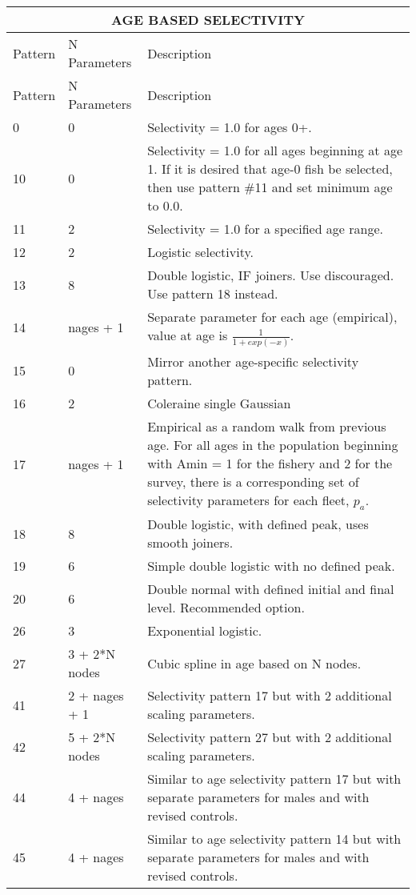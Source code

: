\begin{longtable}{p{2cm} p{3cm} p{10cm}}
	\multicolumn{3}{c}{AGE BASED SELECTIVITY}\\
	\endfirsthead

	\hline
	Pattern & N Parameters & Description \Tstrut\Bstrut\\
	\hline
	\endhead

	\hline
	\endfoot
	\endlastfoot
	
	\hline
	Pattern & N Parameters & Description  \Tstrut\Bstrut\\
	\hline
	0  \Tstrut& 0 & Selectivity = 1.0 for ages 0+.\\
	10 \Tstrut& 0 & Selectivity = 1.0 for all ages beginning at age 1.  If it is desired that age-0 fish be selected, then use pattern \#11 and set minimum age to 0.0. \\
	11 \Tstrut& 2 & Selectivity = 1.0 for a specified age range.\\
	12 \Tstrut& 2 & Logistic selectivity.\\
	13 \Tstrut& 8 & Double logistic, IF joiners.  Use discouraged.  Use pattern 18 instead.\\
	14 \Tstrut& nages + 1 & Separate parameter for each age (empirical), value at age is $\frac{1}{1+exp(-x)}$. \\
	15 \Tstrut& 0 & Mirror another age-specific selectivity pattern.\\
	16 \Tstrut& 2 & Coleraine single Gaussian\\
	17 \Tstrut& nages + 1 & Empirical as a random walk from previous age.  For all ages in the population beginning with Amin = 1 for the fishery and 2 for the survey, there is a corresponding set of selectivity parameters for each fleet, $p_a$. \\
	18 \Tstrut& 8 & Double logistic, with defined peak, uses smooth joiners.  \\
	19 \Tstrut& 6 & Simple double logistic with no defined peak.\\
	20 \Tstrut& 6 & Double normal with defined initial and final level.  Recommended option. \\
	26 \Tstrut& 3 & Exponential logistic.\\
	27 \Tstrut& 3 + 2*N nodes & Cubic spline in age based on N nodes.\\
	41 \Tstrut& 2 + nages + 1 & Selectivity pattern 17 but with 2 additional scaling parameters. \\
	42 \Tstrut& 5 + 2*N nodes & Selectivity pattern 27 but with 2 additional scaling parameters. \\
	44 \Tstrut& 4 + nages & Similar to age selectivity pattern 17 but with separate parameters for males and with revised controls. \\
	45 \Tstrut& 4 + nages & Similar to age selectivity pattern 14 but with separate parameters for males and with revised controls.\Bstrut\\
	\hline
\end{longtable}

